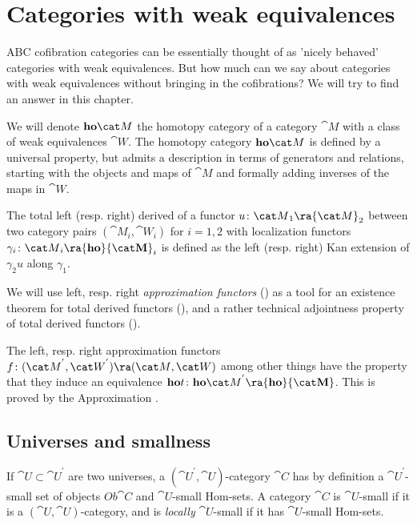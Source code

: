 \chapter{Categories with weak equivalences}
\label{chap:catweq}

ABC cofibration categories can be essentially thought of as 'nicely behaved' categories with weak equivalences. But how much can we say about categories with weak equivalences without bringing in the cofibrations? We will try to find an answer in this chapter.

We will denote ${\bf ho}{\cat M}$ the homotopy category of a category ${\cat M}$ with a class of weak equivalences ${\cat W}$. The homotopy category ${\bf ho}{\cat M}$ is defined by a universal property, but admits a description in terms of generators and relations, starting with the objects and maps of ${\cat M}$ and formally adding inverses of the maps in ${\cat W}$.

The total left (resp. right) derived of a functor $u \colon {\cat M}_1 \ra {\cat M}_2$ between two category pairs $({\cat M}_i, {\cat W}_i)$ for $i = 1, 2$ with localization functors $\gamma_i \colon {\cat M}_i \ra {\bf ho}{\cat M}_i$ is defined as the left (resp. right) Kan extension of $\gamma_2 u$ along $\gamma_1$.

We will use left, resp. right {\it approximation functors} () as a tool for an existence theorem for total derived functors (), and a rather technical adjointness property of total derived functors ().

The left, resp. right approximation functors $f \colon ({\cat M}^{'}, {\cat W}^{'}) \ra ({\cat M}, {\cat W})$ among other things have the property that they induce an equivalence ${\bf ho}t \colon {\bf ho}{\cat M}^{'} \ra {\bf ho}{\cat M}$. This is proved by the Approximation . 

\section{Universes and smallness}
If ${\cat U} \subset {\cat U}^{'}$ are two universes, a $({\cat U}^{'}, {\cat U})$-category ${\cat C}$ has by definition a ${\cat U}^{'}$-small set of objects $Ob{\cat C}$ and ${\cat U}$-small Hom-sets. A category ${\cat C}$ is ${\cat U}$-small if it is a $({\cat U}, {\cat U})$-category, and is {\it locally} ${\cat U}$-small if it has ${\cat U}$-small Hom-sets.

